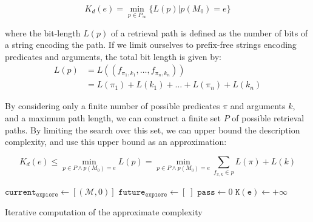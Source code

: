 \documentclass[conference]{IEEEtran}
\begin{document}
\begin{equation}
  \label{eq:k_desc}
  K_d(e) = \min_{p \in P_\infty} \{L(p) | p(M_0) = e\}
\end{equation}

where the bit-length $L(p)$ of a retrieval path is defined as the number of bits of a string encoding the path. If we limit ourselves to prefix-free strings encoding predicates and arguments, the total bit length is given by:
\begin{align}
  \label{eq:bit_lenght_p}
  L(p) & = L((f_{\pi_1,k_1}, \dots, f_{\pi_n, k_n}))     \\
       & = L(\pi_1) + L(k_1) + \dots + L(\pi_n) + L(k_n)
\end{align}


By considering only a finite number of possible predicates $\pi$ and arguments $k$, and a maximum path length, we can construct a finite set $P$ of possible retrieval paths. By limiting the search over this set, we can upper bound the description complexity, and use this upper bound as an approximation:

\begin{equation}
  \label{eq:approx_k_desc}
  K_d(e) \leq \min_{p \in P \land p(M_0) = e} L(p) = \min_{p \in P \land p(M_0)=e} \sum_{f_{\pi, k} \in p} L(\pi) + L(k)
\end{equation}

\begin{algorithm}
  $\mathtt{current_{explore}} \leftarrow [(\mathcal{M}, 0)]$ \;
  $\mathtt{future_{explore} \leftarrow} [\;]$ \;
  $\mathtt{pass} \leftarrow 0$ \;
  $\mathtt{K(e)} \leftarrow +\infty$ \;
  \caption{Iterative computation of the approximate complexity}
  \label{alg:complex_iter}
\end{algorithm}
\end{document}
